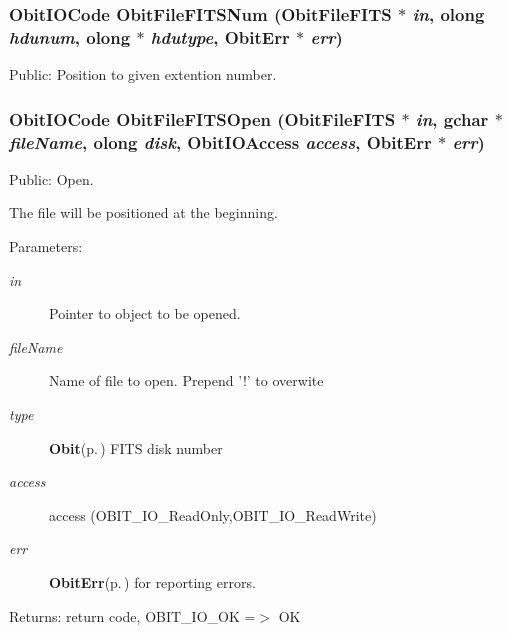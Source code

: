 \subsubsection{\setlength{\rightskip}{0pt plus 5cm}Obit\-IOCode Obit\-File\-FITSNum ({\bf Obit\-File\-FITS} $\ast$ {\em in}, {\bf olong} {\em hdunum}, {\bf olong} $\ast$ {\em hdutype}, {\bf Obit\-Err} $\ast$ {\em err})}\label{ObitFileFITS_8h_a12}


Public: Position to given extention number. 

\subsubsection{\setlength{\rightskip}{0pt plus 5cm}Obit\-IOCode Obit\-File\-FITSOpen ({\bf Obit\-File\-FITS} $\ast$ {\em in}, gchar $\ast$ {\em file\-Name}, {\bf olong} {\em disk}, Obit\-IOAccess {\em access}, {\bf Obit\-Err} $\ast$ {\em err})}\label{ObitFileFITS_8h_a9}


Public: Open. 

The file will be positioned at the beginning. \begin{Desc}
\item[Parameters:]
\begin{description}
\item[{\em in}]Pointer to object to be opened. \item[{\em file\-Name}]Name of file to open. Prepend '!' to overwite \item[{\em type}]{\bf Obit}{\rm (p.\,\pageref{structObit})} FITS disk number \item[{\em access}]access (OBIT\_\-IO\_\-Read\-Only,OBIT\_\-IO\_\-Read\-Write) \item[{\em err}]{\bf Obit\-Err}{\rm (p.\,\pageref{structObitErr})} for reporting errors. \end{description}
\end{Desc}
\begin{Desc}
\item[Returns:]return code, OBIT\_\-IO\_\-OK =$>$ OK \end{Desc}
